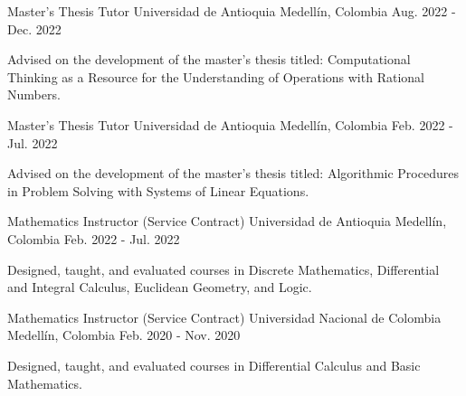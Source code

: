 
\begin{cventries}

\cventry
{Master's Thesis Tutor}
{Universidad de Antioquia}
{Medellín, Colombia}
{Aug. 2022 - Dec. 2022}
{
\begin{cvitems}
\item {Advised on the development of the master's thesis titled: Computational Thinking as a Resource for the Understanding of Operations with Rational Numbers.\hfill \break}
\end{cvitems}
}

\cventry
{Master's Thesis Tutor}
{Universidad de Antioquia}
{Medellín, Colombia}
{Feb. 2022 - Jul. 2022}
{
\begin{cvitems}
\item {Advised on the development of the master's thesis titled: Algorithmic Procedures in Problem Solving with Systems of Linear Equations.\hfill \break}
\end{cvitems}
}

\cventry
{Mathematics Instructor (Service Contract)}
{Universidad de Antioquia}
{Medellín, Colombia}
{Feb. 2022 - Jul. 2022}
{
\begin{cvitems}
\item {Designed, taught, and evaluated courses in Discrete Mathematics, Differential and Integral Calculus, Euclidean Geometry, and Logic.\hfill \break}
\end{cvitems}
}

\cventry
{Mathematics Instructor (Service Contract)}
{Universidad Nacional de Colombia}
{Medellín, Colombia}
{Feb. 2020 - Nov. 2020}
{
\begin{cvitems}
\item {Designed, taught, and evaluated courses in Differential Calculus and Basic Mathematics.\hfill \break}
\end{cvitems}
}

\end{cventries}
